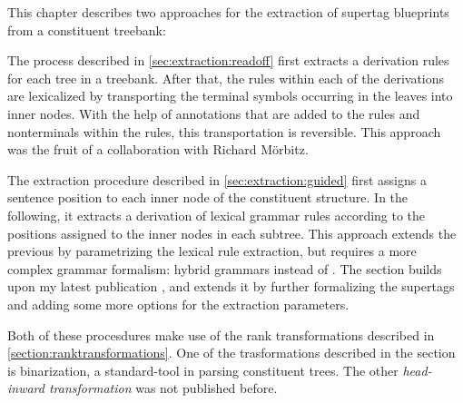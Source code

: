 \documentclass[../document.tex]{subfiles}
\begin{document}
    This chapter describes two approaches for the extraction of supertag blueprints from a constituent treebank:
    \begin{compactenum}
        \item
            The process described in \cref{sec:extraction:readoff} first extracts a derivation  rules for each tree in a treebank.
            After that, the rules within each of the derivations are lexicalized by transporting the terminal symbols occurring in the leaves into inner nodes.
            With the help of annotations that are added to the rules and nonterminals within the rules, this transportation is reversible.
            This approach was the fruit of a collaboration with Richard Mörbitz. \citep{MoeRup20,RupMoe21}
        \item
            The extraction procedure described in \cref{sec:extraction:guided} first assigns a sentence position to each inner node of the constituent structure.
            In the following, it extracts a derivation of lexical grammar rules according to the positions assigned to the inner nodes in each subtree.
            This approach extends the previous by parametrizing the lexical rule extraction, but requires a more complex grammar formalism: hybrid grammars instead of .
            The section builds upon my latest publication \citep{Rup22}, and extends it by further formalizing the supertags and adding some more options for the extraction parameters.
    \end{compactenum}
    Both of these procesdures make use of the rank transformations described in \cref{section:ranktransformations}.
    One of the trasformations described in the section is binarization, a standard-tool in parsing constituent trees.
    The other \emph{head-inward transformation} was not published before.

    
    
    
    

\end{document}
